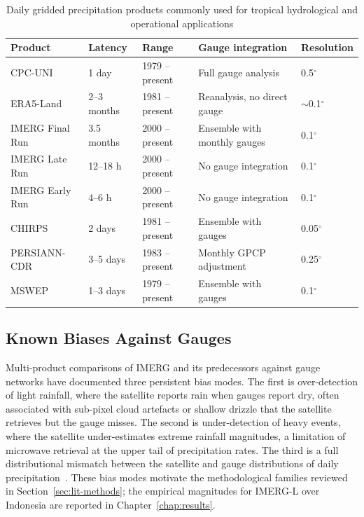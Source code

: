 \begin{table}[H]
\centering
\caption[Daily gridded precipitation products commonly used for tropical hydrological and operational applications]{Daily gridded precipitation products commonly used for
tropical hydrological and operational applications\label{tab:gridded-products}}
\begingroup\footnotesize
\begin{tabular}{@{}lllll@{}}
\toprule
Product & Latency & Range & Gauge integration & Resolution \\
\midrule
CPC-UNI                 & 1 day      & 1979 -- present & Full gauge analysis             & 0.5$^{\circ}$ \\
ERA5-Land               & 2--3 months & 1981 -- present & Reanalysis, no direct gauge     & $\sim$0.1$^{\circ}$ \\
IMERG Final Run         & 3.5 months & 2000 -- present & Ensemble with monthly gauges    & 0.1$^{\circ}$ \\
IMERG Late Run          & 12--18 h   & 2000 -- present & No gauge integration            & 0.1$^{\circ}$ \\
IMERG Early Run         & 4--6 h     & 2000 -- present & No gauge integration            & 0.1$^{\circ}$ \\
CHIRPS                  & 2 days     & 1981 -- present & Ensemble with gauges            & 0.05$^{\circ}$ \\
PERSIANN-CDR            & 3--5 days  & 1983 -- present & Monthly GPCP adjustment         & 0.25$^{\circ}$ \\
MSWEP                   & 1--3 days  & 1979 -- present & Ensemble with gauges            & 0.1$^{\circ}$ \\
\bottomrule
\end{tabular}
\endgroup
\end{table}

\subsection{Known Biases Against Gauges}

Multi-product comparisons of IMERG and its predecessors against
gauge networks have documented three persistent bias modes. The
first is over-detection of light rainfall, where the satellite
reports rain when gauges report dry, often associated with
sub-pixel cloud artefacts or shallow drizzle that the satellite
retrieves but the gauge misses. The second is under-detection of
heavy events, where the satellite under-estimates extreme
rainfall magnitudes, a limitation of microwave retrieval at the
upper tail of precipitation rates. The third is a full
distributional mismatch between the satellite and gauge
distributions of daily
precipitation~\citep{ref:maggioni2016, ref:tan2016, ref:tang2020}.
These bias modes motivate the methodological
families reviewed in Section~\ref{sec:lit-methods}; the
empirical magnitudes for IMERG-L over Indonesia are reported in
Chapter~\ref{chap:results}.

